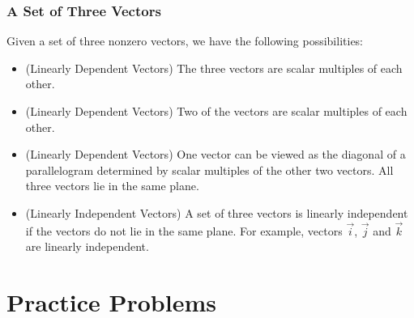 \documentclass{ximera}
\begin{document}
\subsubsection*{A Set of Three Vectors}
Given a set of three nonzero vectors, we have the following possibilities: 
\begin{itemize}
\item (Linearly Dependent Vectors)
The three vectors are scalar multiples of each other.
\begin{image}[1.5in]
\end{image}
\item (Linearly Dependent Vectors) Two of the vectors are scalar multiples of each other.
\begin{image}[1.5in]
\end{image}
\item (Linearly Dependent Vectors) One vector can be viewed as the diagonal of a parallelogram determined by scalar multiples of the other two vectors.  All three vectors lie in the same plane.
\begin{image}[3in]
\end{image}
\item (Linearly Independent Vectors)
A set of three vectors is linearly independent if the vectors do not lie in the same plane.  For example, vectors $\vec{i}$, $\vec{j}$ and $\vec{k}$ are linearly independent.
\end{itemize}
\section*{Practice Problems}
\end{document}
